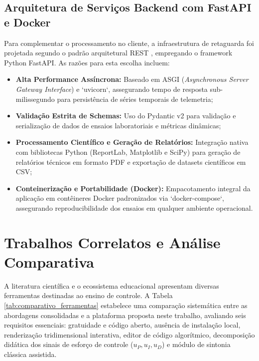 \subsection{Arquitetura de Serviços Backend com FastAPI e Docker}
\label{subsec:backend_fastapi}

Para complementar o processamento no cliente, a infraestrutura de retaguarda foi projetada segundo o padrão arquitetural REST \cite{fielding2000}, empregando o framework Python FastAPI. As razões para esta escolha incluem:

\begin{itemize}
    \item \textbf{Alta Performance Assíncrona:} Baseado em ASGI (\textit{Asynchronous Server Gateway Interface}) e `uvicorn`, assegurando tempo de resposta sub-milissegundo para persistência de séries temporais de telemetria;
    \item \textbf{Validação Estrita de Schemas:} Uso do Pydantic v2 para validação e serialização de dados de ensaios laboratoriais e métricas dinâmicas;
    \item \textbf{Processamento Científico e Geração de Relatórios:} Integração nativa com bibliotecas Python (ReportLab, Matplotlib e SciPy) para geração de relatórios técnicos em formato PDF e exportação de datasets científicos em CSV;
    \item \textbf{Conteinerização e Portabilidade (Docker):} Empacotamento integral da aplicação em contêineres Docker padronizados via `docker-compose`, assegurando reproducibilidade dos ensaios em qualquer ambiente operacional.
\end{itemize}

\section{Trabalhos Correlatos e Análise Comparativa}
\label{sec:trabalhos_correlatos}

A literatura científica e o ecossistema educacional apresentam diversas ferramentas destinadas ao ensino de controle. A Tabela \ref{tab:comparativo_ferramentas} estabelece uma comparação sistemática entre as abordagens consolidadas e a plataforma proposta neste trabalho, avaliando seis requisitos essenciais: gratuidade e código aberto, ausência de instalação local, renderização tridimensional interativa, editor de código algorítmico, decomposição didática dos sinais de esforço de controle ($u_P, u_I, u_D$) e módulo de sintonia clássica assistida.


